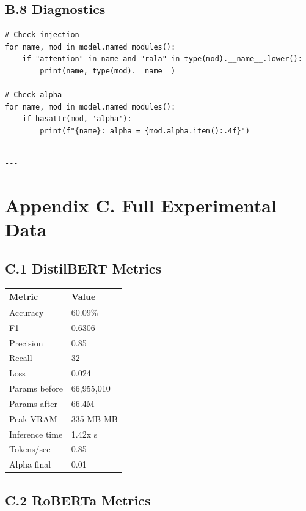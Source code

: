 \subsection{B.8 Diagnostics}

\begin{lstlisting}
# Check injection
for name, mod in model.named_modules():
    if "attention" in name and "rala" in type(mod).__name__.lower():
        print(name, type(mod).__name__)

# Check alpha
for name, mod in model.named_modules():
    if hasattr(mod, 'alpha'):
        print(f"{name}: alpha = {mod.alpha.item():.4f}")
\end{lstlisting}
\begin{lstlisting}

---
\end{lstlisting}


\section{Appendix C. Full Experimental Data}

\subsection{C.1 DistilBERT Metrics}

\begin{table}[H]
\centering
\small
\begin{tabular}{ll}
\toprule
\textbf{Metric} & \textbf{Value} \\
\midrule
Accuracy & 60.09\% \\
F1 & 0.6306 \\
Precision & 0.85 \\
Recall & 32 \\
Loss & 0.024 \\
Params before & 66,955,010 \\
Params after & 66.4M \\
Peak VRAM & 335 MB MB \\
Inference time & 1.42x s \\
Tokens/sec & 0.85 \\
Alpha final & 0.01 \\
\bottomrule
\end{tabular}
\end{table}

\subsection{C.2 RoBERTa Metrics}

